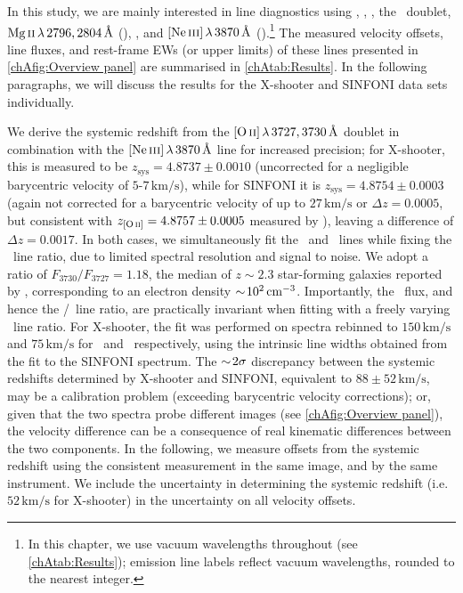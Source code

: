 In this study, we are mainly interested in line diagnostics using \lya, \CIV, \HeII, the \CIII\ doublet, $\MgII \, \lambda \, 2796, 2804 \, \Angstrom$ (\MgII), \OII, and $\NeIII \, \lambda \, 3870 \, \Angstrom$ (\NeIII).\footnote{In this chapter, we use vacuum wavelengths throughout (see \cref{chAtab:Results}); emission line labels reflect vacuum wavelengths, rounded to the nearest integer.} The measured velocity offsets, line fluxes, and rest-frame EWs (or upper limits) of these lines presented in \cref{chAfig:Overview panel} are summarised in \cref{chAtab:Results}. In the following paragraphs, we will discuss the results for the X-shooter and SINFONI data sets individually.

We derive the systemic redshift from the $\OII \, \lambda \, 3727, 3730 \, \Angstrom$ doublet in combination with the $\NeIII \, \lambda \, 3870 \, \Angstrom$ line for increased precision; for X-shooter, this is measured to be $z_\text{sys} = 4.8737 \pm 0.0010$ (uncorrected for a negligible barycentric velocity of $5$-$7 \, \mathrm{km/s}$), while for SINFONI it is $z_\text{sys} = 4.8754 \pm 0.0003$ (again not corrected for a barycentric velocity of up to $27 \, \mathrm{km/s}$ or $\Delta z = 0.0005$, but consistent with $z_\OII = 4.8757 \pm 0.0005$ measured by \citealt{2007MNRAS.376..479S}), leaving a difference of $\Delta z = 0.0017$. In both cases, we simultaneously fit the \OII\ and \NeIII\ lines while fixing the \OII\ line ratio, due to limited spectral resolution and signal to noise. We adopt a ratio of $F_{3730}/F_{3727} = 1.18$, the median of $z \sim 2.3$ star-forming galaxies reported by \citet{2016ApJ...816...23S}, corresponding to an electron density $\sim \! 10^2 \, \mathrm{cm^{-3}}$. Importantly, the \OII\ flux, and hence the \NeIII/\OII\ line ratio, are practically invariant when fitting with a freely varying \OII\ line ratio. For X-shooter, the fit was performed on spectra rebinned to $150 \, \mathrm{km/s}$ and $75 \, \mathrm{km/s}$ for \OII\ and \NeIII\ respectively, using the intrinsic line widths obtained from the fit to the SINFONI spectrum. The $\sim \! 2 \sigma$ discrepancy between the systemic redshifts determined by X-shooter and SINFONI, equivalent to $88 \pm 52 \, \mathrm{km/s}$, may be a calibration problem (exceeding barycentric velocity corrections); or, given that the two spectra probe different images (see \cref{chAfig:Overview panel}), the velocity difference can be a consequence of real kinematic differences between the two components. In the following, we measure offsets from the systemic redshift using the consistent measurement in the same image, and by the same instrument. We include the uncertainty in determining the systemic redshift (i.e. $52 \, \mathrm{km/s}$ for X-shooter) in the uncertainty on all velocity offsets.

